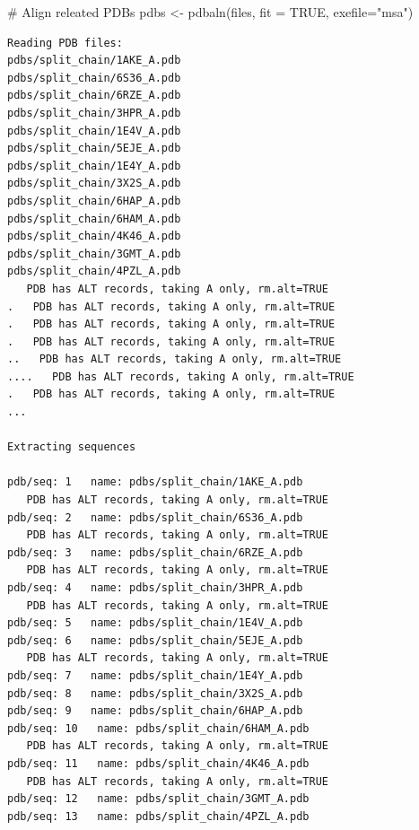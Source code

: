 \documentclass[
  letterpaper,
  DIV=11,
  numbers=noendperiod]{scrartcl}
\newenvironment{Shaded}{\begin{snugshade}}{\end{snugshade}}
\newcommand{\AttributeTok}[1]{\textcolor[rgb]{0.40,0.45,0.13}{#1}}
\newcommand{\CommentTok}[1]{\textcolor[rgb]{0.37,0.37,0.37}{#1}}
\newcommand{\ConstantTok}[1]{\textcolor[rgb]{0.56,0.35,0.01}{#1}}
\newcommand{\FunctionTok}[1]{\textcolor[rgb]{0.28,0.35,0.67}{#1}}
\newcommand{\NormalTok}[1]{\textcolor[rgb]{0.00,0.23,0.31}{#1}}
\newcommand{\OtherTok}[1]{\textcolor[rgb]{0.00,0.23,0.31}{#1}}
\newcommand{\SpecialCharTok}[1]{\textcolor[rgb]{0.37,0.37,0.37}{#1}}
\newcommand{\StringTok}[1]{\textcolor[rgb]{0.13,0.47,0.30}{#1}}
\begin{document}
\begin{Shaded}
\begin{Highlighting}[]
\CommentTok{\# Align releated PDBs}
\NormalTok{pdbs }\OtherTok{\textless{}{-}} \FunctionTok{pdbaln}\NormalTok{(files, }\AttributeTok{fit =} \ConstantTok{TRUE}\NormalTok{, }\AttributeTok{exefile=}\StringTok{"msa"}\NormalTok{)}
\end{Highlighting}
\end{Shaded}

\begin{verbatim}
Reading PDB files:
pdbs/split_chain/1AKE_A.pdb
pdbs/split_chain/6S36_A.pdb
pdbs/split_chain/6RZE_A.pdb
pdbs/split_chain/3HPR_A.pdb
pdbs/split_chain/1E4V_A.pdb
pdbs/split_chain/5EJE_A.pdb
pdbs/split_chain/1E4Y_A.pdb
pdbs/split_chain/3X2S_A.pdb
pdbs/split_chain/6HAP_A.pdb
pdbs/split_chain/6HAM_A.pdb
pdbs/split_chain/4K46_A.pdb
pdbs/split_chain/3GMT_A.pdb
pdbs/split_chain/4PZL_A.pdb
   PDB has ALT records, taking A only, rm.alt=TRUE
.   PDB has ALT records, taking A only, rm.alt=TRUE
.   PDB has ALT records, taking A only, rm.alt=TRUE
.   PDB has ALT records, taking A only, rm.alt=TRUE
..   PDB has ALT records, taking A only, rm.alt=TRUE
....   PDB has ALT records, taking A only, rm.alt=TRUE
.   PDB has ALT records, taking A only, rm.alt=TRUE
...

Extracting sequences

pdb/seq: 1   name: pdbs/split_chain/1AKE_A.pdb 
   PDB has ALT records, taking A only, rm.alt=TRUE
pdb/seq: 2   name: pdbs/split_chain/6S36_A.pdb 
   PDB has ALT records, taking A only, rm.alt=TRUE
pdb/seq: 3   name: pdbs/split_chain/6RZE_A.pdb 
   PDB has ALT records, taking A only, rm.alt=TRUE
pdb/seq: 4   name: pdbs/split_chain/3HPR_A.pdb 
   PDB has ALT records, taking A only, rm.alt=TRUE
pdb/seq: 5   name: pdbs/split_chain/1E4V_A.pdb 
pdb/seq: 6   name: pdbs/split_chain/5EJE_A.pdb 
   PDB has ALT records, taking A only, rm.alt=TRUE
pdb/seq: 7   name: pdbs/split_chain/1E4Y_A.pdb 
pdb/seq: 8   name: pdbs/split_chain/3X2S_A.pdb 
pdb/seq: 9   name: pdbs/split_chain/6HAP_A.pdb 
pdb/seq: 10   name: pdbs/split_chain/6HAM_A.pdb 
   PDB has ALT records, taking A only, rm.alt=TRUE
pdb/seq: 11   name: pdbs/split_chain/4K46_A.pdb 
   PDB has ALT records, taking A only, rm.alt=TRUE
pdb/seq: 12   name: pdbs/split_chain/3GMT_A.pdb 
pdb/seq: 13   name: pdbs/split_chain/4PZL_A.pdb 
\end{verbatim}

\begin{Shaded}
\end{Shaded}
\end{document}
